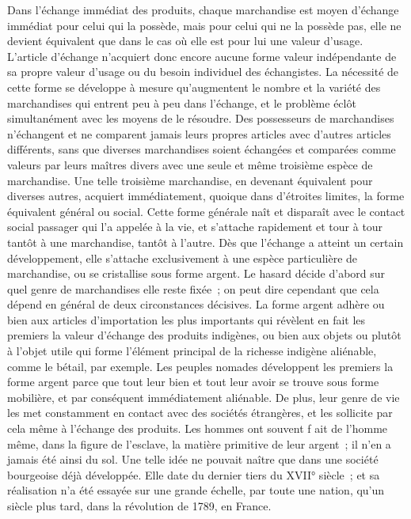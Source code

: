 \documentclass[french,twoside]{book} %
\begin{document}
Dans l’échange immédiat des produits, chaque marchandise est moyen d’échange immédiat pour celui qui la possède, mais pour celui qui ne la possède pas, elle ne devient équivalent que dans le cas où elle est pour lui une valeur d’usage. L’article d’échange n’acquiert donc encore aucune forme valeur indépendante de sa propre valeur d’usage ou du besoin individuel des échangistes. La nécessité de cette forme se développe à mesure qu’augmentent le nombre et la variété des marchandises qui entrent peu à peu dans l’échange, et le problème éclôt simultanément avec les moyens de le résoudre. Des possesseurs de marchandises n’échangent et ne comparent jamais leurs propres articles avec d’autres articles différents, sans que diverses marchandises soient échangées et comparées comme valeurs par leurs maîtres divers avec une seule et même troisième espèce de marchandise. Une telle troisième marchandise, en devenant équivalent pour diverses autres, acquiert immédiatement, quoique dans d’étroites limites, la forme équivalent général ou social. Cette forme générale naît et disparaît avec le contact social passager qui l’a appelée à la vie, et s’attache rapidement et tour à tour tantôt à une marchandise, tantôt à l’autre. Dès que l’échange a atteint un certain développement, elle s’attache exclusivement à une espèce particulière de marchandise, ou se cristallise sous forme argent. Le hasard décide d’abord sur quel genre de marchandises elle reste fixée ; on peut dire cependant que cela dépend en général de deux circonstances décisives. La forme argent adhère ou bien aux articles d’importation les plus importants qui révèlent en fait les premiers la valeur d’échange des produits indigènes, ou bien aux objets ou plutôt à l’objet utile qui forme l’élément principal de la richesse indigène aliénable, comme le bétail, par exemple. Les peuples nomades développent les premiers la forme argent parce que tout leur bien et tout leur avoir se trouve sous forme mobilière, et par conséquent immédiatement aliénable. De plus, leur genre de vie les met constamment en contact avec des sociétés étrangères, et les sollicite par cela même à l’échange des produits. Les hommes ont souvent f ait de l’homme même, dans la figure de l’esclave, la matière primitive de leur argent ; il n’en a jamais été ainsi du sol. Une telle idée ne pouvait naître que dans une société bourgeoise déjà développée. Elle date du dernier tiers du XVII° siècle ; et sa réalisation n’a été essayée sur une grande échelle, par toute une nation, qu’un siècle plus tard, dans la révolution de 1789, en France.\par
\end{document}
